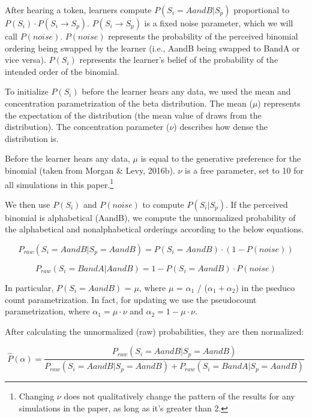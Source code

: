 \documentclass[10pt, letterpaper]{article}
\begin{document}
After hearing a token, learners compute \(P(S_i = AandB|S_p)\)
proportional to \(P(S_i) \cdot P(S_i \to S_p)\). \(P(S_i \to S_p)\) is a
fixed noise parameter, which we will call \(P(noise)\). \(P(noise)\)
represents the probability of the perceived binomial ordering being
swapped by the learner (i.e., AandB being swapped to BandA or vice
versa). \(P(S_i)\) represents the learner's belief of the probability of
the intended order of the binomial.

To initialize \(P(S_i)\) before the learner hears any data, we used the
mean and concentration parametrization of the beta distribution. The
mean (\(\mu\)) represents the expectation of the distribution (the mean
value of draws from the distribution). The concentration parameter
(\(\nu\)) describes how dense the distribution is.

Before the learner hears any data, \(\mu\) is equal to the generative
preference for the binomial (taken from Morgan \& Levy, 2016b). \(\nu\)
is a free parameter, set to 10 for all simulations in this
paper.\footnote{Changing \(\nu\) does not qualitatively change the
  pattern of the results for any simulations in the paper, as long as
  it's greater than 2.}

We then use \(P(S_i)\) and \(P(noise)\) to compute \(P(S_i|S_p)\). If
the perceived binomial is alphabetical (AandB), we compute the
unnormalized probability of the alphabetical and nonalphabetical
orderings according to the below equations.

\begin{equation}
\label{eq:praw}
P_{raw}(S_i = AandB|S_p = AandB) = P(S_i = AandB) \cdot (1 -  P(noise))
\end{equation}

\begin{equation}
\label{eqprawtwo}
P_{raw}(S_i = BandA|AandB) = 1 - P(S_i = AandB) \cdot P(noise)
\end{equation}

In particular, \(P(S_i = AandB)\) = \(\mu\), where \(\mu\) =
\(\alpha_1\) / (\(\alpha_1 + \alpha_2\)) in the pseduco count
parametrization. In fact, for updating we use the pseudocount
parametrization, where \(\alpha_1 = \mu \cdot \nu\) and
\(\alpha_2 = 1-\mu \cdot \nu\).

After calculating the unnormalized (raw) probabilities, they are then
normalized:

\begin{equation}
\label{eq:phatalpha}
{\scriptstyle \hat{P}(\alpha) = \frac{P_{raw}(S_i = AandB|S_p = AandB)}{P_{raw}(S_i = AandB | S_p = AandB) + P_{raw}(S_i = BandA|S_p = AandB)}}
\end{equation}
\end{document}
